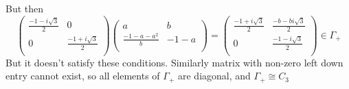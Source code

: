 \documentclass[a4paper]{article}
\begin{document}
But then 
$$\begin{pmatrix}
\frac{-1-i\sqrt{3}}{2} & 0 \\ 
0 &  \frac{-1+i\sqrt{3}}{2}\\
\end{pmatrix} \begin{pmatrix}
a & b \\ 
\frac{-1-a-a^2}{b} & -1-a \\
\end{pmatrix} = \begin{pmatrix}
\frac{-1+i\sqrt{3}}{2} & \frac{-b-b i\sqrt{3}}{2} \\ 
0 & \frac{-1-i\sqrt{3}}{2} \\
\end{pmatrix} \in \Gamma_+$$
But it doesn't satisfy these conditions.
Similarly matrix with non-zero left down entry cannot exist, so all elements of $\Gamma_+$ are diagonal, and $\Gamma_+ \cong C_3$
\end{document}

